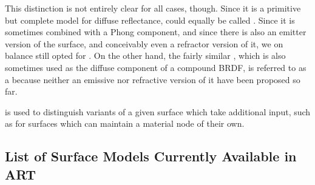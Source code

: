     This distinction is not entirely clear for all cases, though. Since it is a primitive but complete model for diffuse reflectance,  could equally be called . Since it is sometimes combined with a Phong component, and since there is also an emitter version of the surface, and conceivably even a refractor version of it, we on balance still opted for . On the other hand, the fairly similar , which is also sometimes used as the diffuse component of a compound BRDF, is referred to as a  because neither an emissive nor refractive version of it have been proposed so far.
 
     is used to distinguish variants of a given surface
    which take additional input, such as  for surfaces which can
    maintain a material node of their own.


\subsection{List of Surface Models Currently Available in ART}

